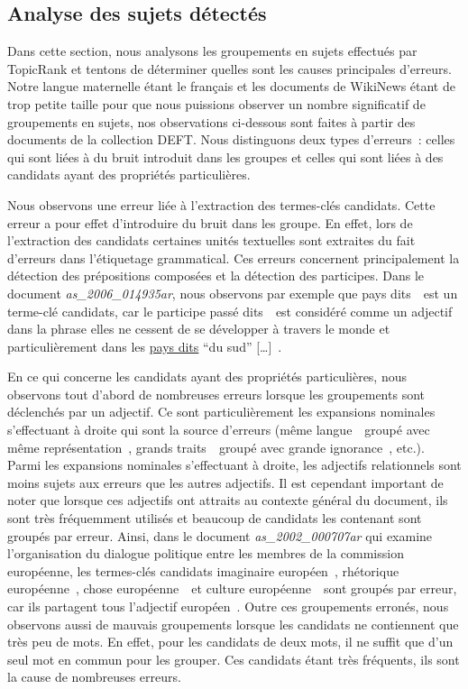   \subsection{Analyse des sujets détectés}
  \label{subsec:analyse_des_sujets_générés}
    Dans cette section, nous analysons les groupements en sujets effectués par
    TopicRank et tentons de déterminer quelles sont les causes principales
    d'erreurs. Notre langue maternelle étant le français et les documents de
    WikiNews étant de trop petite taille pour que nous puissions observer un
    nombre significatif de groupements en sujets, nos observations ci-dessous
    sont faites à partir des documents de la collection DEFT. Nous distinguons
    deux types d'erreurs~: celles qui sont liées à du bruit introduit dans les
    groupes et celles qui sont liées à des candidats ayant des propriétés
    particulières.

    Nous observons une erreur liée à l'extraction des termes-clés candidats.
    Cette erreur a pour effet d'introduire du bruit dans les groupe. En effet,
    lors de l'extraction des candidats certaines unités textuelles sont
    extraites du fait d'erreurs dans l'étiquetage grammatical. Ces erreurs
    concernent principalement la détection des prépositions composées et la
    détection des participes. Dans le document \textit{as\_2006\_014935ar}, nous
    observons par exemple que \og pays dits~\fg\ est un terme-clé candidats, car
    le participe passé \og dits~\fg\ est considéré comme un adjectif dans la
    phrase \og [\dots] elles ne cessent de se développer à travers le monde et
    particulièrement dans les \underline{pays dits} ``du sud'' [\dots]~\fg.

    En ce qui concerne les candidats ayant des propriétés particulières, nous
    observons tout d'abord de nombreuses erreurs lorsque les groupements sont
    déclenchés par un adjectif. Ce sont particulièrement les expansions
    nominales s'effectuant à droite qui sont la source d'erreurs (\og même
    langue~\fg\ groupé avec \og même représentation~\fg, \og grands
    traits~\fg\ groupé avec \og grande ignorance~\fg, etc.). Parmi les
    expansions nominales s'effectuant à droite, les adjectifs relationnels sont
    moins sujets aux erreurs que les autres adjectifs. Il est cependant
    important de noter que lorsque ces adjectifs ont attraits au contexte
    général du document, ils sont très fréquemment utilisés et beaucoup de
    candidats les contenant sont groupés par erreur. Ainsi, dans le document
    \textit{as\_2002\_000707ar} qui examine l'organisation du dialogue politique
    entre les membres de la commission européenne, les termes-clés candidats
    \og imaginaire européen~\fg, \og rhétorique européenne~\fg, \og chose
    européenne~\fg\ et \og culture européenne~\fg\ sont groupés par erreur, car
    ils partagent tous l'adjectif \og européen~\fg. Outre ces groupements
    erronés, nous observons aussi de mauvais groupements lorsque les candidats
    ne contiennent que très peu de mots. En effet, pour les candidats de deux
    mots, il ne suffit que d'un seul mot en commun pour les grouper. Ces
    candidats étant très fréquents, ils sont la cause de nombreuses erreurs.

